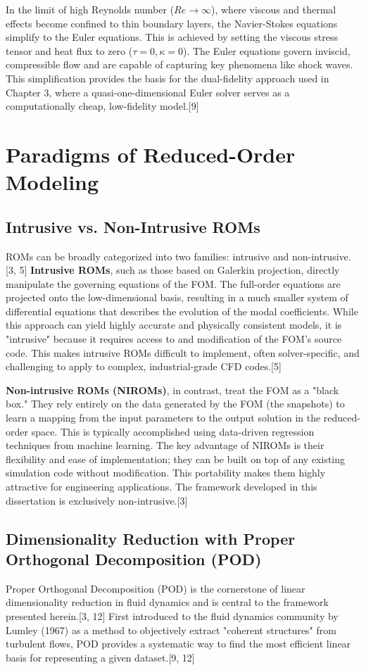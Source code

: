 \documentclass[12pt, a4paper]{report}
\begin{document}
In the limit of high Reynolds number ($Re \rightarrow \infty$), where viscous and thermal effects become confined to thin boundary layers, the Navier-Stokes equations simplify to the Euler equations. This is achieved by setting the viscous stress tensor and heat flux to zero ($\tau=0, \kappa=0$). The Euler equations govern inviscid, compressible flow and are capable of capturing key phenomena like shock waves. This simplification provides the basis for the dual-fidelity approach used in Chapter 3, where a quasi-one-dimensional Euler solver serves as a computationally cheap, low-fidelity model.[9]

\section{Paradigms of Reduced-Order Modeling}

\subsection{Intrusive vs. Non-Intrusive ROMs}
ROMs can be broadly categorized into two families: intrusive and non-intrusive.[3, 5] 
\textbf{Intrusive ROMs}, such as those based on Galerkin projection, directly manipulate the governing equations of the FOM. The full-order equations are projected onto the low-dimensional basis, resulting in a much smaller system of differential equations that describes the evolution of the modal coefficients. While this approach can yield highly accurate and physically consistent models, it is "intrusive" because it requires access to and modification of the FOM's source code. This makes intrusive ROMs difficult to implement, often solver-specific, and challenging to apply to complex, industrial-grade CFD codes.[5]

\textbf{Non-intrusive ROMs (NIROMs)}, in contrast, treat the FOM as a "black box." They rely entirely on the data generated by the FOM (the snapshots) to learn a mapping from the input parameters to the output solution in the reduced-order space. This is typically accomplished using data-driven regression techniques from machine learning. The key advantage of NIROMs is their flexibility and ease of implementation; they can be built on top of any existing simulation code without modification. This portability makes them highly attractive for engineering applications. The framework developed in this dissertation is exclusively non-intrusive.[3]

\subsection{Dimensionality Reduction with Proper Orthogonal Decomposition (POD)}
Proper Orthogonal Decomposition (POD) is the cornerstone of linear dimensionality reduction in fluid dynamics and is central to the framework presented herein.[3, 12] First introduced to the fluid dynamics community by Lumley (1967) as a method to objectively extract "coherent structures" from turbulent flows, POD provides a systematic way to find the most efficient linear basis for representing a given dataset.[9, 12]
\end{document}
